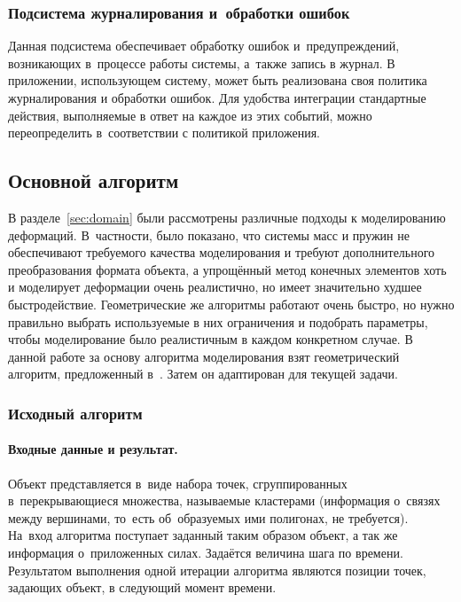 \documentclass[a4paper, 14pt, titlepage]{extarticle}
\begin{document}
      \subsubsection{Подсистема журналирования и~обработки ошибок}

        Данная подсистема обеспечивает обработку ошибок и~предупреждений, возникающих в~процессе
        работы системы, а~также запись в журнал. В приложении, использующем систему, может
        быть реализована своя политика журналирования и обработки ошибок. Для удобства интеграции
        стандартные действия, выполняемые в ответ на каждое из этих событий, можно переопределить
        в~соответствии с политикой приложения.

      \subsection{Основной алгоритм}\label{ssec:basic_algorithm}

      В разделе~\ref{sec:domain} были рассмотрены различные подходы к моделированию деформаций.
      В~частности, было показано, что системы масс и пружин не обеспечивают требуемого качества
      моделирования и требуют дополнительного преобразования формата объекта, а упрощённый метод конечных элементов
      хоть и моделирует деформации очень реалистично, но имеет значительно худшее быстродействие.
      Геометрические же алгоритмы работают очень быстро, но нужно правильно выбрать используемые в
      них ограничения и подобрать параметры, чтобы моделирование было реалистичным в каждом
      конкретном случае. В данной работе за основу алгоритма моделирования взят геометрический
      алгоритм, предложенный в~\cite{mueller-meshless}. Затем он адаптирован для текущей задачи.

      \subsubsection{Исходный алгоритм}

        \paragraph{Входные данные и результат.} Объект представляется в~виде набора точек,
        сгруппированных в~перекрывающиеся множества, называемые кластерами
        (информация о~связях между вершинами, то~есть об~образуемых ими полигонах, не требуется).
        На~вход алгоритма поступает заданный таким образом объект, а так же информация о~приложенных
        силах. Задаётся величина шага по времени. Результатом выполнения одной итерации алгоритма
        являются позиции точек, задающих объект, в следующий момент времени.
\end{document}
